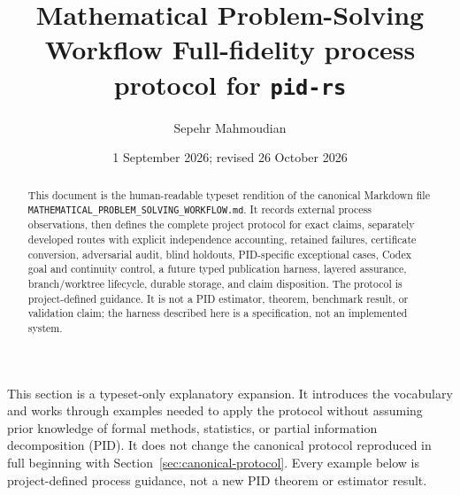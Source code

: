 \documentclass[11pt]{article}
\title{\PidReportTitle
  {Mathematical Problem-Solving Workflow}
  {Full-fidelity process protocol for \texttt{pid-rs}}}
\author{Sepehr Mahmoudian}
\date{1 September 2026; revised 26 October 2026}
\begin{document}
\PidMakeTitle

\begin{abstract}
This document is the human-readable typeset rendition of the canonical Markdown file
\texttt{MATHEMATICAL\_PROBLEM\_}\allowbreak\texttt{SOLVING\_WORKFLOW.md}. It records external process observations,
then defines the complete project protocol for exact claims, separately developed routes with
explicit independence accounting, retained failures, certificate conversion, adversarial audit,
blind holdouts, PID-specific exceptional
cases, Codex goal and continuity control, a future typed publication harness, layered assurance,
branch/worktree lifecycle, durable storage, and claim disposition. The protocol is project-defined
guidance. It is not a PID estimator,
theorem, benchmark result, or validation claim; the harness described here is a specification, not
an implemented system.
\end{abstract}

\begingroup
\small
\setlength{\parskip}{0pt}
\tableofcontents
\endgroup

\clearpage



This section is a typeset-only explanatory expansion.  It introduces the vocabulary and works
through examples needed to apply the protocol without assuming prior knowledge of formal methods,
statistics, or partial information decomposition (PID).  It does not change the canonical protocol
reproduced in full beginning with Section~\ref{sec:canonical-protocol}.  Every example below is
project-defined process guidance, not a new PID theorem or estimator result.

\end{document}
